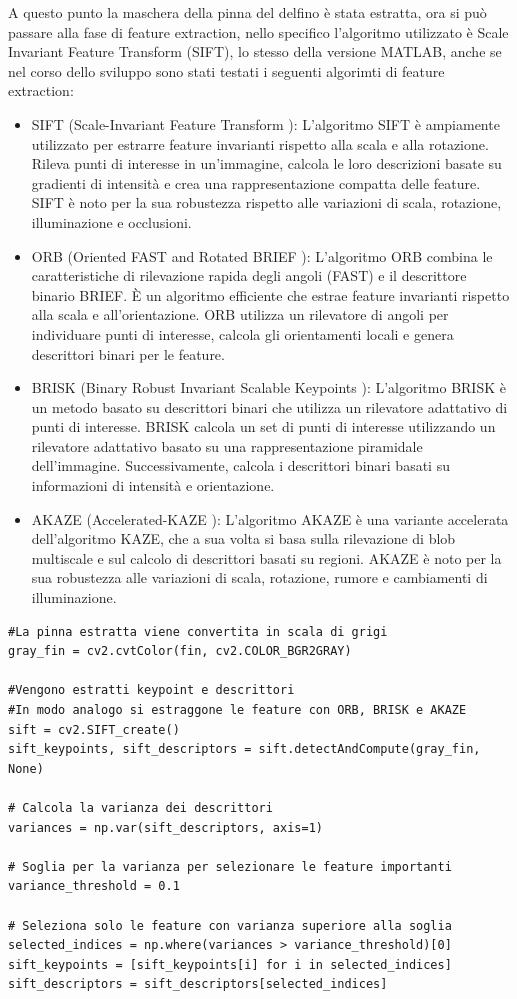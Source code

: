 \documentclass[a4paper,12pt]{report}
\begin{document}
    A questo punto la maschera della pinna del delfino è stata estratta, 
    ora si può passare alla fase di feature extraction, nello specifico l'algoritmo utilizzato 
    è Scale Invariant Feature Transform (SIFT), lo stesso della versione MATLAB,
    anche se nel corso dello sviluppo sono stati testati i seguenti algorimti di feature extraction:
    \begin{itemize}
      \item SIFT (Scale-Invariant Feature Transform \cite{lowe2004distinctive}): L'algoritmo SIFT è ampiamente utilizzato per estrarre feature invarianti rispetto alla scala e alla rotazione. Rileva punti di interesse in un'immagine, calcola le loro descrizioni basate su gradienti di intensità e crea una rappresentazione compatta delle feature. SIFT è noto per la sua robustezza rispetto alle variazioni di scala, rotazione, illuminazione e occlusioni.
      \item ORB (Oriented FAST and Rotated BRIEF \cite{rublee2011orb}): L'algoritmo ORB combina le caratteristiche di rilevazione rapida degli angoli (FAST) e il descrittore binario BRIEF. È un algoritmo efficiente che estrae feature invarianti rispetto alla scala e all'orientazione. ORB utilizza un rilevatore di angoli per individuare punti di interesse, calcola gli orientamenti locali e genera descrittori binari per le feature.
      \newpage
      \item BRISK (Binary Robust Invariant Scalable Keypoints \cite{leutenegger2011brisk}): L'algoritmo BRISK è un metodo basato su descrittori binari che utilizza un rilevatore adattativo di punti di interesse. BRISK calcola un set di punti di interesse utilizzando un rilevatore adattativo basato su una rappresentazione piramidale dell'immagine. Successivamente, calcola i descrittori binari basati su informazioni di intensità e orientazione.
      \item AKAZE (Accelerated-KAZE \cite{alcantarilla2012fast}): L'algoritmo AKAZE è una variante accelerata dell'algoritmo KAZE, che a sua volta si basa sulla rilevazione di blob multiscale e sul calcolo di descrittori basati su regioni. AKAZE è noto per la sua robustezza alle variazioni di scala, rotazione, rumore e cambiamenti di illuminazione.
    \end{itemize}
\begin{lstlisting}
#La pinna estratta viene convertita in scala di grigi
gray_fin = cv2.cvtColor(fin, cv2.COLOR_BGR2GRAY)

#Vengono estratti keypoint e descrittori
#In modo analogo si estraggone le feature con ORB, BRISK e AKAZE
sift = cv2.SIFT_create()
sift_keypoints, sift_descriptors = sift.detectAndCompute(gray_fin, None)

# Calcola la varianza dei descrittori
variances = np.var(sift_descriptors, axis=1)

# Soglia per la varianza per selezionare le feature importanti
variance_threshold = 0.1

# Seleziona solo le feature con varianza superiore alla soglia
selected_indices = np.where(variances > variance_threshold)[0]
sift_keypoints = [sift_keypoints[i] for i in selected_indices]
sift_descriptors = sift_descriptors[selected_indices]
\end{lstlisting}
\end{document}
